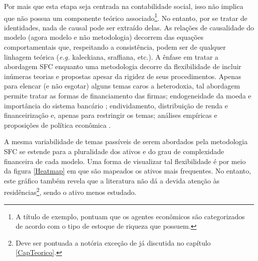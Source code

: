 Por mais que esta etapa seja centrada na contabilidade social, isso não implica que não possua um componente teórico associado\footnote{A título de exemplo, \textcite[p.~15--16]{macedo_e_silva_peering_2011}  pontuam que %
	os agentes econômicos são categorizados de acordo com o tipo de estoque de riqueza que possuem.
}. 
No entanto, por se tratar de identidades, nada de causal pode ser extraído delas. As relações de causalidade do modelo (agora modelo e não metodologia) decorrem das equações comportamentais que, respeitando a consistência, podem ser de qualquer linhagem teórica (\textit{e.g.} kaleckiana, sraffiana, etc.). A ênfase em tratar a abordagem SFC enquanto uma metodologia decorre da flexibilidade de incluir inúmeras teorias e propostas apesar da rigidez de seus procedimentos. Apenas para elencar (e não esgotar) alguns temas caros a heterodoxia, tal abordagem permite tratar as formas de financiamento das firmas; endogeneidade da moeda e importância do sistema bancário \cites{godley_money_1999}{lavoie_note_1999}; endividamento, distribuição de renda e financeirização \cites{dos_santos_revisiting_2009}{palley_inside_2010}{hein_finance-dominated_2012} e, apenas para restringir os temas; análises empíricas e proposições de política econômica \cites{godley_seven_1999}{godley_fiscal_2007}{godley_simple_2007}{arestis_income_2011}. 

A mesma variabilidade de temas passíveis de serem abordados pela metodologia SFC se estende para a pluralidade dos ativos e do grau de complexidade financeira de cada modelo. Uma forma de visualizar tal flexibilidade é por meio da figura \ref{Heatmap} em que são mapeados os ativos mais frequentes. No entanto, este gráfico também revela que a literatura não dá a devida atenção às residências\footnote{Deve ser pontuada a notória exceção de \textcite{zezza_u.s._2008} já discutida no capítulo \ref{CapTeorico}.}, sendo o ativo menos estudado. 



